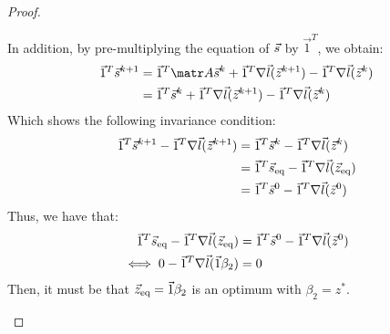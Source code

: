\begin{description}
\begin{theorem}
\begin{proof}
\begin{description}
                        In addition, by pre-multiplying the equation of ${\vec{s}}$ by $\vec{1}^T$, we obtain:
                        \[
                            \begin{split}
                                \vec{1}^T \s^{k+1} &= \vec{1}^T \A \s^k + \vec{1}^T \nabla \vec{l}(\z^{k+1}) - \vec{1}^T \nabla \vec{l}(\z^{k}) \\
                                &= \vec{1}^T \s^k + \vec{1}^T \nabla \vec{l}(\z^{k+1}) - \vec{1}^T \nabla \vec{l}(\z^{k}) 
                            \end{split}
                        \]
                        Which shows the following invariance condition:
                        \[ 
                            \begin{aligned}
                                \vec{1}^T {\vec{s}}^{k+1} - \vec{1}^T \nabla \vec{l}({\vec{z}}^{k+1})
                                &= \vec{1}^T {\vec{s}}^k - \vec{1}^T \nabla \vec{l}({\vec{z}}^{k}) \\
                                &= \vec{1}^T {\vec{s}}_\text{eq} - \vec{1}^T \nabla \vec{l}({\vec{z}}_\text{eq}) \\
                                &= \vec{1}^T {\vec{s}}^0 - \vec{1}^T \nabla \vec{l}({\vec{z}}^{0}) \\
                            \end{aligned}
                        \]
                        Thus, we have that:
                        \[
                            \begin{split}
                                \vec{1}^T {\vec{s}}_\text{eq} - \vec{1}^T \nabla \vec{l}({\vec{z}}_\text{eq})
                                &= \vec{1}^T {\vec{s}}^0 - \vec{1}^T \nabla \vec{l}({\vec{z}}^{0}) \\
                                \iff 0 - \vec{1}^T \nabla \vec{l}(\vec{1}\beta_2) &= 0 \\
                            \end{split}
                        \]
                        Then, it must be that ${\vec{z}}_\text{eq} = \vec{1}\beta_2$ is an optimum with $\beta_2 = z^*$.
                

\end{description}
\end{proof}
\end{theorem}
\end{description}
